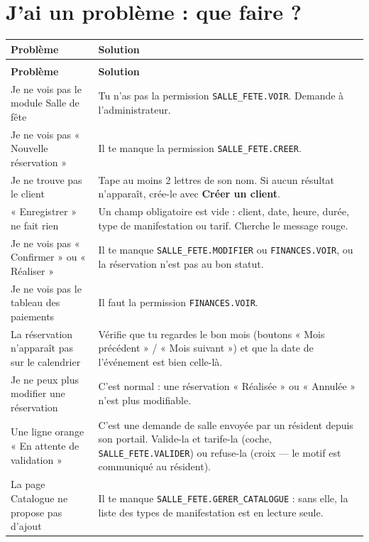 \documentclass[12pt,a4paper]{article}
\begin{document}
\newpage

\section{J'ai un problème : que faire ?}

\begin{longtable}{>{\raggedright}p{5cm} p{9cm}}
\toprule
\textbf{Problème} & \textbf{Solution} \\
\midrule
\endfirsthead
\multicolumn{2}{c}{\textit{Suite de la FAQ}} \\
\toprule
\textbf{Problème} & \textbf{Solution} \\
\midrule
\endhead
\bottomrule
\endfoot

Je ne vois pas le module Salle de fête & Tu n'as pas la permission \texttt{SALLE\_FETE.VOIR}. Demande à l'administrateur. \\

Je ne vois pas « Nouvelle réservation » & Il te manque la permission \texttt{SALLE\_FETE.CREER}. \\

Je ne trouve pas le client & Tape au moins 2 lettres de son nom. Si aucun résultat n'apparaît, crée-le avec \textbf{Créer un client}. \\

« Enregistrer » ne fait rien & Un champ obligatoire est vide : client, date, heure, durée, type de manifestation ou tarif. Cherche le message rouge. \\

Je ne vois pas « Confirmer » ou « Réaliser » & Il te manque \texttt{SALLE\_FETE.MODIFIER} ou \texttt{FINANCES.VOIR}, ou la réservation n'est pas au bon statut. \\

Je ne vois pas le tableau des paiements & Il faut la permission \texttt{FINANCES.VOIR}. \\

La réservation n'apparaît pas sur le calendrier & Vérifie que tu regardes le bon mois (boutons « Mois précédent » / « Mois suivant ») et que la date de l'événement est bien celle-là. \\

Je ne peux plus modifier une réservation & C'est normal : une réservation « Réalisée » ou « Annulée » n'est plus modifiable. \\

Une ligne orange « En attente de validation » & C'est une demande de salle envoyée par un résident depuis son portail. Valide-la et tarife-la (coche, \texttt{SALLE\_FETE.VALIDER}) ou refuse-la (croix — le motif est communiqué au résident). \\

La page Catalogue ne propose pas d'ajout & Il te manque \texttt{SALLE\_FETE.GERER\_CATALOGUE} : sans elle, la liste des types de manifestation est en lecture seule. \\

\bottomrule
\end{longtable}
\end{document}
